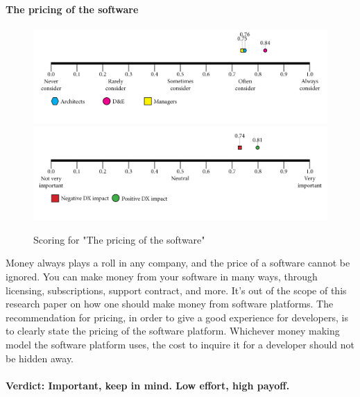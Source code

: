     \paragraph{The pricing of the software}
    \begin{figure}[H]
        \centering
        \includegraphics[width=\linewidth]{scorelines/aspect9.png}
        \includegraphics[width=\linewidth]{dxscorelines/dxaspect9.png}
        \caption{Scoring for "The pricing of the software"}
        \label{fig:aspect9}
    \end{figure}
    Money always plays a roll in any company, and the price of a software cannot be ignored. You can make money from your software in many ways, through licensing, subscriptions, support contract, and more. It's out of the scope of this research paper on how one should make money from software platforms. The recommendation for pricing, in order to give a good experience for developers, is to clearly state the pricing of the software platform. Whichever money making model the software platform uses, the cost to inquire it for a developer should not be hidden away. \\ \\
    \textbf{Verdict: Important, keep in mind. Low effort, high payoff.}
    
